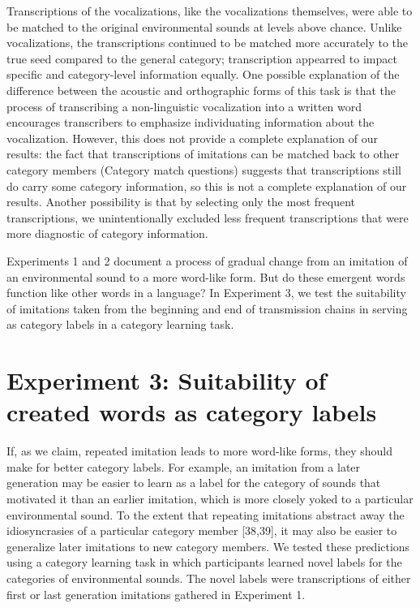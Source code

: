 \documentclass[english,floatsintext,man]{apa6}
\theoremstyle{definition}
\theoremstyle{definition}
\theoremstyle{definition}
\theoremstyle{remark}
\begin{document}
Transcriptions of the vocalizations, like the vocalizations themselves,
were able to be matched to the original environmental sounds at levels
above chance. Unlike vocalizations, the transcriptions continued to be
matched more accurately to the true seed compared to the general
category; transcription appearred to impact specific and category-level
information equally. One possible explanation of the difference between
the acoustic and orthographic forms of this task is that the process of
transcribing a non-linguistic vocalization into a written word
encourages transcribers to emphasize individuating information about the
vocalization. However, this does not provide a complete explanation of
our results: the fact that transcriptions of imitations can be matched
back to other category members (Category match questions) suggests that
transcriptions still do carry some category information, so this is not
a complete explanation of our results. Another possibility is that by
selecting only the most frequent transcriptions, we unintentionally
excluded less frequent transcriptions that were more diagnostic of
category information.

Experiments 1 and 2 document a process of gradual change from an
imitation of an environmental sound to a more word-like form. But do
these emergent words function like other words in a language? In
Experiment 3, we test the suitability of imitations taken from the
beginning and end of transmission chains in serving as category labels
in a category learning task.

\hypertarget{experiment-3-suitability-of-created-words-as-category-labels}{%
\section{Experiment 3: Suitability of created words as category
labels}\label{experiment-3-suitability-of-created-words-as-category-labels}}

If, as we claim, repeated imitation leads to more word-like forms, they
should make for better category labels. For example, an imitation from a
later generation may be easier to learn as a label for the category of
sounds that motivated it than an earlier imitation, which is more
closely yoked to a particular environmental sound. To the extent that
repeating imitations abstract away the idiosyncrasies of a particular
category member {[}38,39{]}, it may also be easier to generalize later
imitations to new category members. We tested these predictions using a
category learning task in which participants learned novel labels for
the categories of environmental sounds. The novel labels were
transcriptions of either first or last generation imitations gathered in
Experiment 1.
\end{document}
